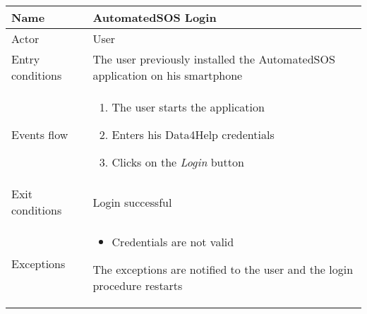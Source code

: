 \begin{table}[h!]
    \begin{tabular}{|l|p{12cm}|}
        \hline
        Name             & AutomatedSOS Login \\ \hline
        Actor            & User \\ \hline
        Entry conditions & The user previously installed the AutomatedSOS application on his smartphone \\ \hline
        Events flow      & 
        \begin{enumerate}
            \item The user starts the application
            \item Enters his Data4Help credentials
            \item Clicks on the \textit{Login}  button
        \end{enumerate} \\ \hline
        Exit conditions  & Login successful\\ \hline
        Exceptions       & 
        \begin{itemize}
            \item Credentials are not valid
        \end{itemize} The exceptions are notified to the user and the login procedure restarts  \\ \hline
    \end{tabular}
\end{table}

\newpage

